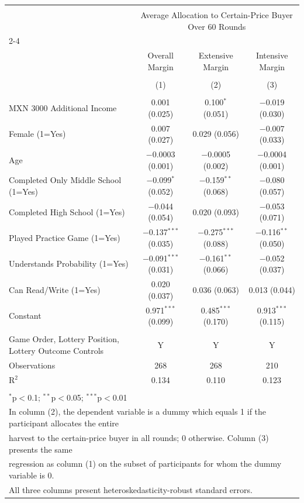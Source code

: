 
\begin{table}[!htbp] \centering 
   
   
\begin{tabular}{@{\extracolsep{5pt}}lccc} 
\\[-1.8ex]\hline 
\hline \\[-1.8ex] 
 & \multicolumn{3}{c}{Average Allocation to Certain-Price Buyer Over 60 Rounds} \\ 
\cline{2-4} 
\\[-1.8ex] & Overall Margin & Extensive Margin & Intensive Margin \\ 
\\[-1.8ex] & (1) & (2) & (3)\\ 
\hline \\[-1.8ex] 
 MXN 3000 Additional Income & 0.001 (0.025) & 0.100$^{*}$ (0.051) & $-$0.019 (0.030) \\ 
  Female (1=Yes) & 0.007 (0.027) & 0.029 (0.056) & $-$0.007 (0.033) \\ 
  Age & $-$0.0003 (0.001) & $-$0.0005 (0.002) & $-$0.0004 (0.001) \\ 
  Completed Only Middle School (1=Yes) & $-$0.099$^{*}$ (0.052) & $-$0.159$^{**}$ (0.068) & $-$0.080 (0.057) \\ 
  Completed High School (1=Yes) & $-$0.044 (0.054) & 0.020 (0.093) & $-$0.053 (0.071) \\ 
  Played Practice Game (1=Yes) & $-$0.137$^{***}$ (0.035) & $-$0.275$^{***}$ (0.088) & $-$0.116$^{**}$ (0.050) \\ 
  Understands Probability (1=Yes) & $-$0.091$^{***}$ (0.031) & $-$0.161$^{**}$ (0.066) & $-$0.052 (0.037) \\ 
  Can Read/Write (1=Yes) & 0.020 (0.037) & 0.036 (0.063) & 0.013 (0.044) \\ 
  Constant & 0.971$^{***}$ (0.099) & 0.485$^{***}$ (0.170) & 0.913$^{***}$ (0.115) \\ 
 \hline \\[-1.8ex] 
Game Order, Lottery Position, Lottery Outcome Controls & Y & Y & Y \\ 
Observations & 268 & 268 & 210 \\ 
R$^{2}$ & 0.134 & 0.110 & 0.123 \\ 
\hline 
\hline \\[-1.8ex] 
\multicolumn{4}{l}{$^{*}$p$<$0.1; $^{**}$p$<$0.05; $^{***}$p$<$0.01} \\ 
\multicolumn{4}{l}{In column (2), the dependent variable is a dummy which equals 1 if the participant allocates the entire} \\ 
\multicolumn{4}{l}{harvest to the certain-price buyer in all rounds; 0 otherwise. Column (3) presents the same} \\ 
\multicolumn{4}{l}{regression as column (1) on the subset of participants for whom the dummy variable is 0.} \\ 
\multicolumn{4}{l}{All three columns present heteroskedasticity-robust standard errors.} \\ 
\end{tabular} 
\end{table} 
